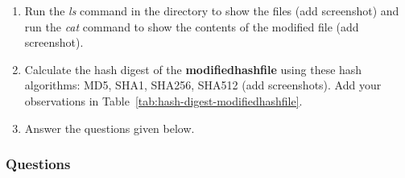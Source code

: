\documentclass[11pt,letterpaper]{article}
\begin{document}
\begin{enumerate}
		\item Run the \textit{ls} command in the directory to show the files (add screenshot) and run the \textit{cat} command to show the contents of the modified file (add screenshot).
		
		\item Calculate the hash digest of the \textbf{modifiedhashfile} using these hash algorithms: MD5, SHA1, SHA256, SHA512 (add screenshots). Add your observations in Table~\ref{tab:hash-digest-modifiedhashfile}.
		
		\item Answer the questions given below.
		
	\end{enumerate}
	\newpage
	\subsubsection*{Questions}
\end{document}
